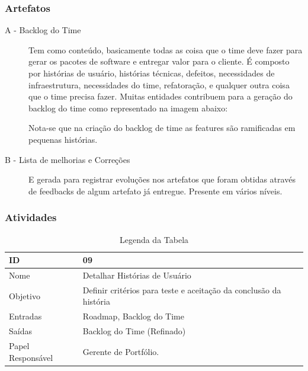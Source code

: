   \subsubsection{Artefatos}

\begin{description}
  \item[A - Backlog do Time]
  Tem como conteúdo, basicamente todas as coisa que o time deve fazer para gerar
  os pacotes de software e entregar valor para o cliente. É composto por histórias
  de usuário, histórias técnicas, defeitos, necessidades de infraestrutura, necessidades
  do time, refatoração, e qualquer outra coisa que o time precisa fazer. Muitas entidades
  contribuem para a geração do backlog do time como representado na imagem abaixo:

  Nota-se que na criação do backlog de time as features são ramificadas em pequenas histórias.


  \item[B - Lista de melhorias e Correções]
   E gerada para registrar evoluções nos artefatos que foram obtidas através de feedbacks
  de algum artefato já entregue. Presente em vários níveis.

\end{description}


  \subsubsection{Atividades}

  \begin{table}[H]
    \centering
      \begin{tabular}{| m{5em} | m{10cm} |}
        \hline
        ID       & 09   \\ \hline
        Nome     & Detalhar Histórias de Usuário  \\ \hline
        Objetivo & Definir critérios para teste e aceitação da conclusão da história  \\ \hline
        Entradas & Roadmap, Backlog do Time\\ \hline
        Saídas   & Backlog do Time (Refinado) \\ \hline
        Papel Responsável   & Gerente de Portfólio. \\ \hline
      \end{tabular}
      \caption{Legenda da Tabela}
      \label{tabela:atividade9}
  \end{table}

